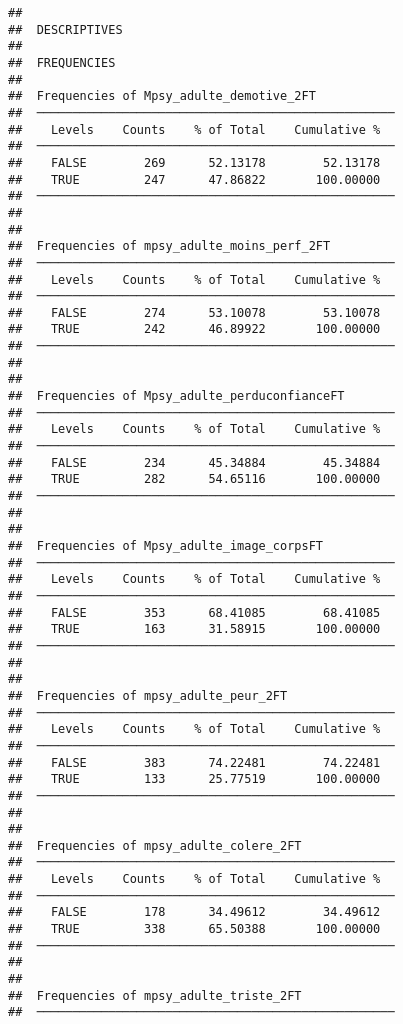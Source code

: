 \documentclass[
]{article}
\begin{document}
\begin{verbatim}
## 
##  DESCRIPTIVES
## 
##  FREQUENCIES
## 
##  Frequencies of Mpsy_adulte_demotive_2FT            
##  ────────────────────────────────────────────────── 
##    Levels    Counts    % of Total    Cumulative %   
##  ────────────────────────────────────────────────── 
##    FALSE        269      52.13178        52.13178   
##    TRUE         247      47.86822       100.00000   
##  ────────────────────────────────────────────────── 
## 
## 
##  Frequencies of mpsy_adulte_moins_perf_2FT          
##  ────────────────────────────────────────────────── 
##    Levels    Counts    % of Total    Cumulative %   
##  ────────────────────────────────────────────────── 
##    FALSE        274      53.10078        53.10078   
##    TRUE         242      46.89922       100.00000   
##  ────────────────────────────────────────────────── 
## 
## 
##  Frequencies of Mpsy_adulte_perduconfianceFT        
##  ────────────────────────────────────────────────── 
##    Levels    Counts    % of Total    Cumulative %   
##  ────────────────────────────────────────────────── 
##    FALSE        234      45.34884        45.34884   
##    TRUE         282      54.65116       100.00000   
##  ────────────────────────────────────────────────── 
## 
## 
##  Frequencies of Mpsy_adulte_image_corpsFT           
##  ────────────────────────────────────────────────── 
##    Levels    Counts    % of Total    Cumulative %   
##  ────────────────────────────────────────────────── 
##    FALSE        353      68.41085        68.41085   
##    TRUE         163      31.58915       100.00000   
##  ────────────────────────────────────────────────── 
## 
## 
##  Frequencies of mpsy_adulte_peur_2FT                
##  ────────────────────────────────────────────────── 
##    Levels    Counts    % of Total    Cumulative %   
##  ────────────────────────────────────────────────── 
##    FALSE        383      74.22481        74.22481   
##    TRUE         133      25.77519       100.00000   
##  ────────────────────────────────────────────────── 
## 
## 
##  Frequencies of mpsy_adulte_colere_2FT              
##  ────────────────────────────────────────────────── 
##    Levels    Counts    % of Total    Cumulative %   
##  ────────────────────────────────────────────────── 
##    FALSE        178      34.49612        34.49612   
##    TRUE         338      65.50388       100.00000   
##  ────────────────────────────────────────────────── 
## 
## 
##  Frequencies of mpsy_adulte_triste_2FT              
##  ────────────────────────────────────────────────── 

\end{verbatim}
\end{document}
